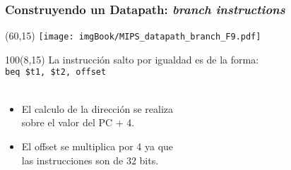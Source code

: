 \documentclass[aspectratio=169]{beamer}
\begin{document}
\begin{frame}[t,fragile]
    \frametitle{Construyendo un Datapath: \emph{branch instructions}}
    \begin{textblock}{60}(60,15)
    \texttt{[image: imgBook/MIPS\_datapath\_branch\_F9.pdf]}
    \end{textblock}
    \begin{textblock}{100}(8,15)
    La instrucción salto por igualdad es de la forma:\\
    \hspace{0.28cm} \verb|beq $t1, $t2, offset|\\
    \bigskip
    \small
    \bigskip
    \normalsize
    \\
    \begin{itemize}
    \item<3-> El calculo de la dirección se realiza\\ sobre el valor del PC + 4.
    \item<4-> El offset se multiplica por 4 ya que\\ las instrucciones son de 32 bits.
    \end{itemize}
    \end{textblock}
\end{frame}
\end{document}
